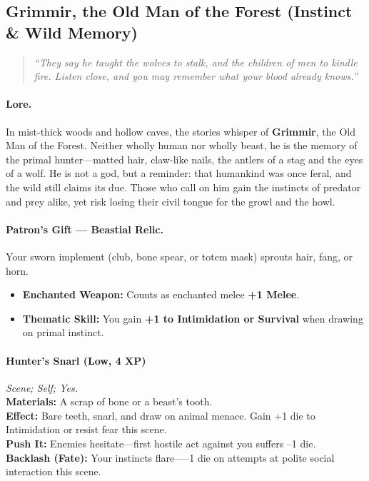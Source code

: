 \subsection{Grimmir, the Old Man of the Forest (Instinct \& Wild Memory)}
\begin{quote}\itshape
“They say he taught the wolves to stalk, and the children of men to kindle fire. Listen close, and you may remember what your blood already knows.”
\end{quote}

\paragraph{Lore.}
In mist-thick woods and hollow caves, the stories whisper of \textbf{Grimmir}, the Old Man of the Forest. Neither wholly human nor wholly beast, he is the memory of the primal hunter—matted hair, claw-like nails, the antlers of a stag and the eyes of a wolf. He is not a god, but a reminder: that humankind was once feral, and the wild still claims its due. Those who call on him gain the instincts of predator and prey alike, yet risk losing their civil tongue for the growl and the howl.

\paragraph{Patron’s Gift — Beastial Relic.}
Your sworn implement (club, bone spear, or totem mask) sprouts hair, fang, or horn.
\begin{itemize}
  \item \textbf{Enchanted Weapon:} Counts as enchanted melee \textbf{+1 Melee}.
  \item \textbf{Thematic Skill:} You gain \textbf{+1 to Intimidation or Survival} when drawing on primal instinct.
\end{itemize}


\paragraph{Hunter’s Snarl (Low, 4 XP)} \emph{Scene; Self; Yes.}\\
\textbf{Materials:} A scrap of bone or a beast’s tooth.\\
\textbf{Effect:} Bare teeth, snarl, and draw on animal menace. Gain +1 die to Intimidation or resist fear this scene.\\
\textbf{Push It:} Enemies hesitate—first hostile act against you suffers --1 die.\\
\textbf{Backlash (Fate):} Your instincts flare—--1 die on attempts at polite social interaction this scene.


